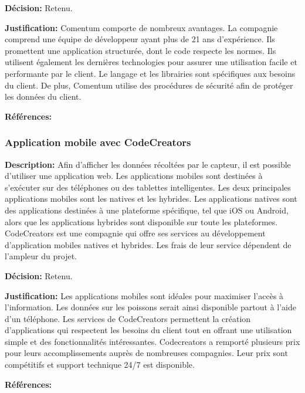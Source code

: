\textbf{Décision:} Retenu.

\textbf{Justification:} Comentum comporte de nombreux avantages. La compagnie comprend une équipe de développeur ayant plus de 21 ans d'expérience. Ils promettent une application structurée, dont le code respecte les normes. Ils utilisent également les dernières technologies pour assurer une utilisation facile et performante par le client. Le langage et les librairies sont spécifiques aux besoins du client. De plus, Comentum utilise des procédures de sécurité afin de protéger les données du client.

\textbf{Références:} \cite{Comentum} \cite{Tizen}

\subsubsection{Application mobile avec CodeCreators}

\textbf{Description:} Afin d'afficher les données récoltées par le capteur, il est possible d'utiliser une application web. Les applications mobiles sont destinées à s'exécuter sur des téléphones ou des tablettes intelligentes. Les deux principales applications mobiles sont les natives et les hybrides. Les applications natives sont des applications destinées à une plateforme spécifique, tel que iOS ou Android, alors que les applications hybrides sont disponible sur toute les plateformes. CodeCreators est une compagnie qui offre ses services au développement d'application mobiles natives et hybrides. Les frais de leur service dépendent de l'ampleur du projet.

\textbf{Décision:} Retenu.

\textbf{Justification:} Les applications mobiles sont idéales pour maximiser l'accès à l'information. Les données sur les poissons serait ainsi disponible partout à l'aide d'un téléphone. Les services de CodeCreators permettent la création d'applications qui respectent les besoins du client tout en offrant une utilisation simple et des fonctionnalités intéressantes. Codecreators a remporté plusieurs prix pour leurs accomplissements auprès de nombreuses compagnies. Leur prix sont compétitifs et support technique 24/7 est disponible.

\textbf{Références:} \cite{CodeCreators} \cite{CodeCreators2}

